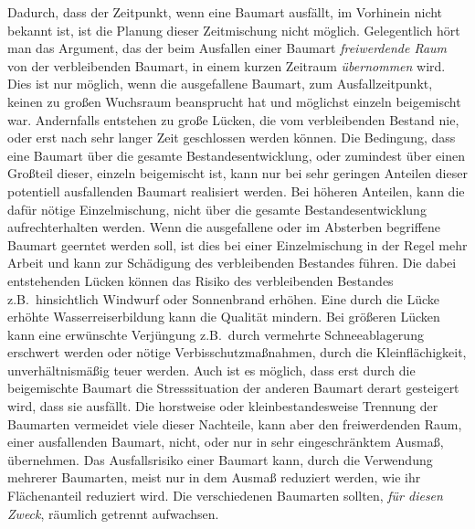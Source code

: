 \documentclass[twocolumn]{scrartcl}
\begin{document}
Dadurch, dass der Zeitpunkt, wenn eine Baumart ausfällt, im Vorhinein nicht
bekannt ist, ist die Planung dieser Zeitmischung nicht möglich. Gelegentlich
hört man das Argument, das der beim Ausfallen einer Baumart \emph{freiwerdende
Raum} von der verbleibenden Baumart, in einem kurzen Zeitraum \emph{übernommen}
wird. Dies ist nur möglich, wenn die ausgefallene Baumart, zum Ausfallzeitpunkt,
keinen zu großen Wuchsraum beansprucht hat und möglichst einzeln beigemischt
war. Andernfalls entstehen zu große Lücken, die vom verbleibenden Bestand nie,
oder erst nach sehr langer Zeit geschlossen werden können. Die Bedingung, dass
eine Baumart über die gesamte Bestandesentwicklung, oder zumindest über einen
Großteil dieser, einzeln beigemischt ist, kann nur bei sehr geringen Anteilen
dieser potentiell ausfallenden Baumart realisiert werden. Bei höheren Anteilen,
kann die dafür nötige Einzelmischung, nicht über die gesamte
Bestandesentwicklung aufrechterhalten werden. Wenn die ausgefallene oder im
Absterben begriffene Baumart geerntet werden soll, ist dies bei einer
Einzelmischung in der Regel mehr Arbeit und kann zur Schädigung des
verbleibenden Bestandes führen. Die dabei entstehenden Lücken können das Risiko
des verbleibenden Bestandes z.B.\ hinsichtlich Windwurf oder Sonnenbrand
erhöhen. Eine durch die Lücke erhöhte Wasserreiserbildung kann die Qualität
mindern. Bei größeren Lücken kann eine erwünschte Verjüngung z.B.\ durch
vermehrte Schneeablagerung erschwert werden oder nötige Verbisschutzmaßnahmen,
durch die Kleinflächigkeit, unverhältnismäßig teuer werden. Auch ist es möglich,
dass erst durch die beigemischte Baumart die Stresssituation der anderen Baumart
derart gesteigert wird, dass sie ausfällt. Die horstweise oder
kleinbestandesweise Trennung der Baumarten vermeidet viele dieser Nachteile,
kann aber den freiwerdenden Raum, einer ausfallenden Baumart, nicht, oder nur in
sehr eingeschränktem Ausmaß, übernehmen. Das Ausfallsrisiko einer Baumart kann,
durch die Verwendung mehrerer Baumarten, meist nur in dem Ausmaß reduziert
werden, wie ihr Flächenanteil reduziert wird. Die verschiedenen Baumarten
sollten, \emph{für diesen Zweck}, räumlich getrennt aufwachsen.
\end{document}
